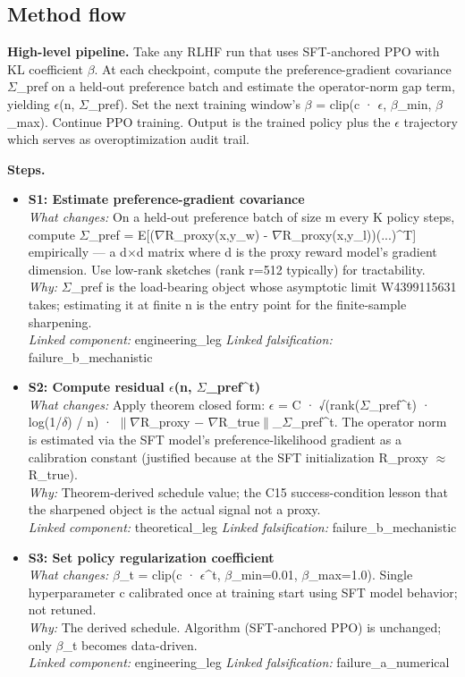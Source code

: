 \documentclass[10pt,a4paper]{article}
\begin{document}
\begin{tcolorbox}[colback=bgskill, colframe=cblue, title=\textbf{NoveltySkill — Idea Card (L3 Oral-Ready)}, breakable]
\section*{Method flow}
\textbf{High-level pipeline.} Take any RLHF run that uses SFT-anchored PPO with KL coefficient $\beta$. At each checkpoint, compute the preference-gradient covariance $\Sigma$\_pref on a held-out preference batch and estimate the operator-norm gap term, yielding $\epsilon$(n, $\Sigma$\_pref). Set the next training window's $\beta$ = clip(c · $\epsilon$, $\beta$\_min, $\beta$\_max). Continue PPO training. Output is the trained policy plus the $\epsilon$ trajectory which serves as overoptimization audit trail.

\textbf{Steps.}
\begin{itemize}[leftmargin=*]
  \item \textbf{S1: Estimate preference-gradient covariance} \\ \emph{What changes:} On a held-out preference batch of size m every K policy steps, compute $\Sigma$\_pref = E[($\nabla$R\_proxy(x,y\_w) - $\nabla$R\_proxy(x,y\_l))(...)\textasciicircum{}T] empirically --- a d$\times$d matrix where d is the proxy reward model's gradient dimension. Use low-rank sketches (rank r=512 typically) for tractability. \\ \emph{Why:} $\Sigma$\_pref is the load-bearing object whose asymptotic limit W4399115631 takes; estimating it at finite n is the entry point for the finite-sample sharpening. \\ \emph{Linked component:} engineering\_leg \quad \emph{Linked falsification:} failure\_b\_mechanistic
  \item \textbf{S2: Compute residual $\epsilon$(n, $\Sigma$\_pref\textasciicircum{}t)} \\ \emph{What changes:} Apply theorem closed form: $\epsilon$ = C · √(rank($\Sigma$\_pref\textasciicircum{}t) · log(1/$\delta$) / n) · $\|$$\nabla$R\_proxy − $\nabla$R\_true$\|$\_$\Sigma$\_pref\textasciicircum{}t. The operator norm is estimated via the SFT model's preference-likelihood gradient as a calibration constant (justified because at the SFT initialization R\_proxy $\approx$ R\_true). \\ \emph{Why:} Theorem-derived schedule value; the C15 success-condition lesson that the sharpened object is the actual signal not a proxy. \\ \emph{Linked component:} theoretical\_leg \quad \emph{Linked falsification:} failure\_b\_mechanistic
  \item \textbf{S3: Set policy regularization coefficient} \\ \emph{What changes:} $\beta$\_t = clip(c · $\epsilon$\textasciicircum{}t, $\beta$\_min=0.01, $\beta$\_max=1.0). Single hyperparameter c calibrated once at training start using SFT model behavior; not retuned. \\ \emph{Why:} The derived schedule. Algorithm (SFT-anchored PPO) is unchanged; only $\beta$\_t becomes data-driven. \\ \emph{Linked component:} engineering\_leg \quad \emph{Linked falsification:} failure\_a\_numerical
$$
\end{itemize}
\end{tcolorbox}
\end{document}
